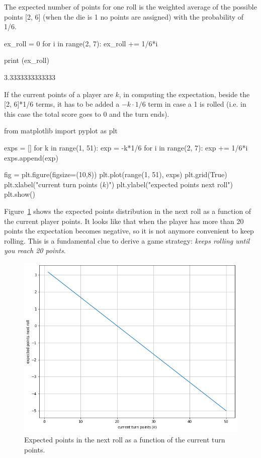 \cprotEnv\begin{solution}
The expected number of points for one roll is the weighted average of the possible points [2, 6] (when the die is 1 no points are assigned) with the probability of 1/6.
\begin{ipython}
ex_roll = 0
for i in range(2, 7):
    ex_roll += 1/6*i

print (ex_roll)
\end{ipython}
\begin{ioutput}
3.3333333333333
\end{ioutput}

If the current points of a player are $k$, in computing the expectation, beside the [2, 6]*1/6 terms, it has to be added a $-k\cdot 1/6$ term in case a 1 is rolled (i.e. in this case the total score goes to 0 and the turn ends).
\begin{ipython}
from matplotlib import pyplot as plt

exps = []
for k in range(1, 51):
    exp = -k*1/6
    for i in range(2, 7):
        exp += 1/6*i
    exps.append(exp)

fig = plt.figure(figsize=(10,8))
plt.plot(range(1, 51), exps)
plt.grid(True)
plt.xlabel("current turn points ($k$)")
plt.ylabel("expected points next roll")
plt.show()
\end{ipython}

Figure~\ref{fig:greedy_pig_expec} shows the expected points distribution in the next roll as a function of the current player points. It looks like that when the player has more than 20 points the expectation becomes negative, so it is not anymore convenient to keep rolling. This is a fundamental clue to derive a game strategy: \emph{keeps rolling until you reach 20 points}.

\begin{figure}[htbp]
	\begin{center}
		\includegraphics[width=0.7\linewidth]{figures/greedy_pig_expectation}
	\end{center}
\caption{Expected points in the next roll as a function of the current turn points.}
\label{fig:greedy_pig_expec}
\end{figure}
\end{solution}

